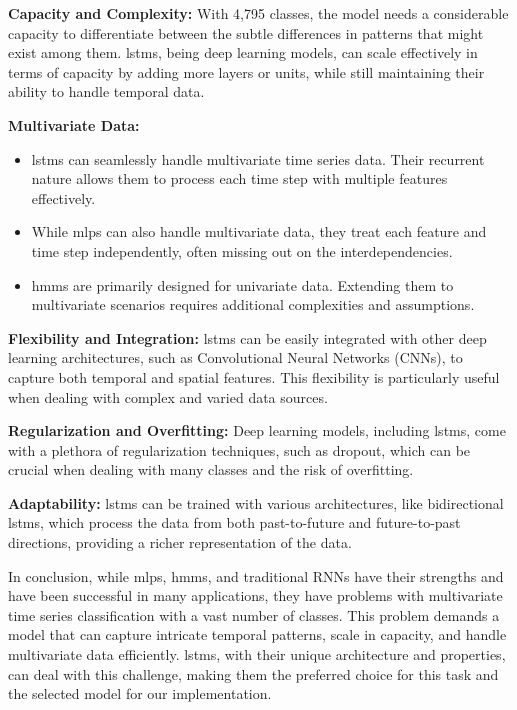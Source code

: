 \textbf{Capacity and Complexity:}
With 4,795 classes, the model needs a considerable capacity to differentiate between the subtle differences in patterns that might exist among them. 
\acp{lstm}, being deep learning models, can scale effectively in terms of capacity by adding more layers or units, while still maintaining their ability to handle temporal data.

\textbf{Multivariate Data:}
\begin{itemize}
    \item \acp{lstm} can seamlessly handle multivariate time series data. Their recurrent nature allows them to process each time step with multiple features effectively.
    \item While \acp{mlp} can also handle multivariate data, they treat each feature and time step independently, often missing out on the interdependencies.
    \item \acp{hmm} are primarily designed for univariate data. Extending them to multivariate scenarios requires additional complexities and assumptions.
\end{itemize}

\textbf{Flexibility and Integration:}
\acp{lstm} can be easily integrated with other deep learning architectures, such as Convolutional Neural Networks (CNNs), to capture both temporal and spatial features. 
This flexibility is particularly useful when dealing with complex and varied data sources.

\textbf{Regularization and Overfitting:}
Deep learning models, including \acp{lstm}, come with a plethora of regularization techniques, such as dropout, which can be crucial when dealing with many classes and the risk of overfitting.

\textbf{Adaptability:}
\acp{lstm} can be trained with various architectures, like bidirectional \acp{lstm}, which process the data from both past-to-future and future-to-past directions, providing a richer representation of the data.


In conclusion, while \acp{mlp}, \acp{hmm}, and traditional RNNs have their strengths and have been successful in many applications, they have problems with multivariate time series classification with a vast number of classes.
This problem demands a model that can capture intricate temporal patterns, scale in capacity, and handle multivariate data efficiently.
\acp{lstm}, with their unique architecture and properties, can deal with this challenge, making them the preferred choice for this task and the selected model for our implementation.


